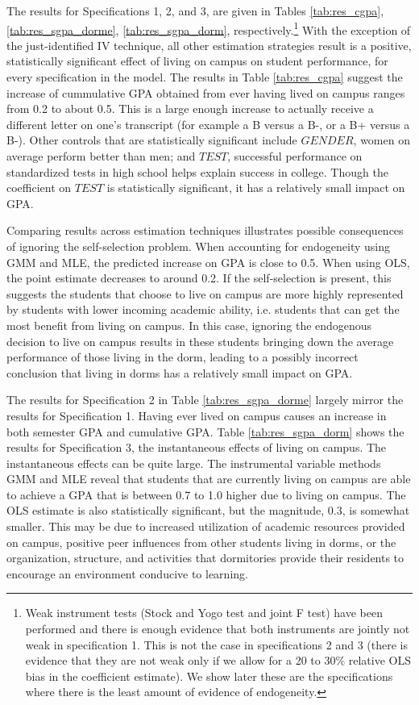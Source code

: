 \documentclass[12pt]{article}
\begin{document}
The results for Specifications 1, 2, and 3, are given in Tables \ref{tab:res_cgpa}, \ref{tab:res_sgpa_dorme}, \ref{tab:res_sgpa_dorm}, respectively.\footnote{Weak instrument tests (Stock and Yogo test and joint F test) have been performed and there is enough evidence that both instruments are jointly not weak in specification 1. This is not the case in specifications 2 and 3 (there is evidence that they are not weak only if we allow for a 20 to 30\% relative OLS bias in the coefficient estimate).  We show later these are the specifications where there is the least amount of evidence of endogeneity.}  With the exception of the just-identified IV technique, all other estimation strategies result is a positive, statistically significant effect of living on campus on student performance, for every specification in the model.  The results in Table \ref{tab:res_cgpa} suggest the increase of cummulative GPA obtained from ever having lived on campus ranges from 0.2 to about 0.5.  This is a large enough increase to actually receive a different letter on one's transcript (for example a B versus a B-, or a B+ versus a B-).  Other controls that are statistically significant include $GENDER$, women on average perform better than men; and $TEST$, successful performance on standardized tests in high school helps explain success in college.  Though the coefficient on $TEST$ is statistically significant, it has a relatively small impact on GPA.

Comparing results across estimation techniques illustrates possible consequences of ignoring the self-selection problem.  When accounting for endogeneity using GMM and MLE, the predicted increase on GPA is close to 0.5.  When using OLS, the point estimate decreases to around 0.2.  If the self-selection is present, this suggests the students that choose to live on campus are more highly represented by students with lower incoming academic ability, i.e. students that can get the most benefit from living on campus.  In this case, ignoring the endogenous decision to live on campus results in these students bringing down the average performance of those living in the dorm, leading to a possibly incorrect conclusion that living in dorms has a relatively small impact on GPA.  

The results for Specification 2 in Table \ref{tab:res_sgpa_dorme} largely mirror the results for Specification 1.  Having ever lived on campus causes an increase in both semester GPA and cumulative GPA.  Table \ref{tab:res_sgpa_dorm} shows the results for Specification 3, the instantaneous effects of living on campus.  The instantaneous effects can be quite large.  The instrumental variable methods GMM and MLE reveal that students that are currently living on campus are able to achieve a GPA that is between 0.7 to 1.0 higher due to living on campus.  The OLS estimate is also statistically significant, but the magnitude, 0.3, is somewhat smaller.  This may be due to increased utilization of academic resources provided on campus, positive peer influences from other students living in dorms, or the organization, structure, and activities that dormitories provide their residents to encourage an environment conducive to learning.
\end{document}
